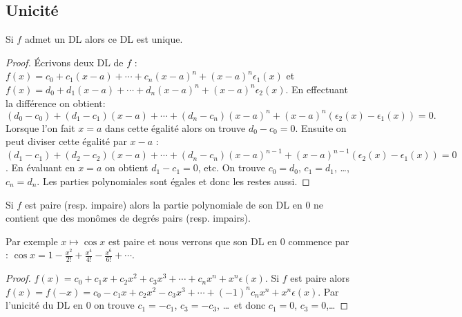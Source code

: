 \documentclass[class=report,crop=false]{standalone}
\begin{document}
\subsection{Unicité}

\begin{proposition}
Si $f$ admet un DL alors ce DL est unique.
\end{proposition}

\begin{proof}
Écrivons deux DL de $f$ :
$f(x)=c_0+c_1(x-a)+\cdots+c_n(x-a)^n+(x-a)^n\epsilon_1(x)$
et $f(x)=d_0+d_1(x-a)+\cdots+d_n(x-a)^n+(x-a)^n\epsilon_2(x)$.
En effectuant la différence on obtient:
\[
(d_0-c_0)+(d_1-c_1)(x-a)+\cdots+(d_n-c_n)(x-a)^n+(x-a)^n(\epsilon_2(x)-\epsilon_1(x))=0.
\]
Lorsque l'on fait $x=a$ dans cette égalité alors on trouve $d_0-c_0=0$.
Ensuite on peut diviser cette égalité par $x-a$  :
$(d_1-c_1)+(d_2-c_2)(x-a)+\cdots+(d_n-c_n)(x-a)^{n-1}+(x-a)^{n-1}(\epsilon_2(x)-\epsilon_1(x))=0$.
En évaluant en $x=a$ on obtient $d_1-c_1=0$, etc.
On trouve $c_0=d_0$, $c_1=d_1$, \ldots, $c_n=d_n$.
Les parties polynomiales sont égales et donc les restes aussi.
\end{proof}




\begin{corollaire}
Si $f$ est paire (resp. impaire) alors la partie polynomiale de son DL en $0$
ne contient que des monômes de degrés pairs (resp. impairs).
\end{corollaire}

Par exemple $x \mapsto \cos x$ est paire et nous verrons que son DL en $0$ commence par :
$\cos x=1-\frac{x^2}{2!}+\frac{x^4}{4!}-\frac{x^6}{6!}+\cdots$.

\begin{proof}
 $f(x)=c_0+c_1 x +c_2x^2+c_3x^3+\cdots+c_nx^n+x^n\epsilon(x)$. Si $f$ est paire alors
$f(x)=f(-x)=c_0-c_1 x+c_2x^2-c_3x^3 +\cdots+(-1)^nc_nx^n+x^n\epsilon(x)$.
Par l'unicité du DL en $0$ on trouve $c_1=-c_1$, $c_3=-c_3$, \ldots \
et donc $c_1=0$, $c_3=0$,\ldots
\end{proof}
\end{document}
